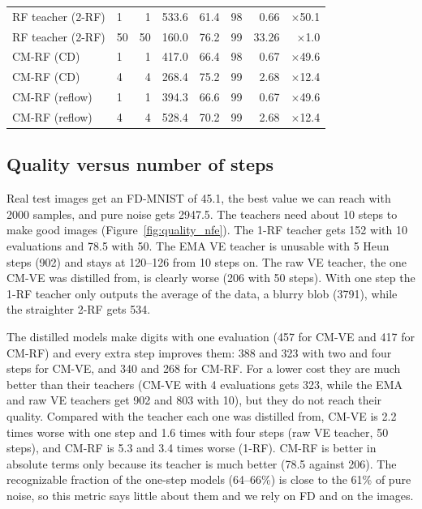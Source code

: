 \documentclass{article}
\begin{document}
\begin{table}[!htbp]
\begin{tabular}{llrrrrrr}
    RF teacher (2-RF) & 1 & 1 & 533.6 & 61.4 & 98 & 0.66 & $\times$50.1 \\
    RF teacher (2-RF) & 50 & 50 & 160.0 & 76.2 & 99 & 33.26 & $\times$1.0 \\
    \midrule
    CM-RF (CD) & 1 & 1 & 417.0 & 66.4 & 98 & 0.67 & $\times$49.6 \\
    CM-RF (CD) & 4 & 4 & 268.4 & 75.2 & 99 & 2.68 & $\times$12.4 \\
    \midrule
    CM-RF (reflow) & 1 & 1 & 394.3 & 66.6 & 99 & 0.67 & $\times$49.6 \\
    CM-RF (reflow) & 4 & 4 & 528.4 & 70.2 & 99 & 2.68 & $\times$12.4 \\
    \bottomrule
  \end{tabular}
\end{table}

\subsection{Quality versus number of steps}

Real test images get an FD-MNIST of 45.1, the best value we can reach with 2000
samples, and pure noise gets 2947.5. The teachers need about 10 steps to make
good images (Figure~\ref{fig:quality_nfe}). The 1-RF teacher gets 152 with 10
evaluations and 78.5 with 50. The EMA VE teacher is unusable with 5 Heun steps
(902) and stays at 120--126 from 10 steps on. The raw VE teacher, the one CM-VE
was distilled from, is clearly worse (206 with 50 steps). With one step the 1-RF
teacher only outputs the average of the data, a blurry blob (3791), while the
straighter 2-RF gets 534.

The distilled models make digits with one evaluation (457 for CM-VE and 417 for
CM-RF) and every extra step improves them: 388 and 323 with two and four steps
for CM-VE, and 340 and 268 for CM-RF. For a lower cost they are much better than
their teachers (CM-VE with 4 evaluations gets 323, while the EMA and raw VE
teachers get 902 and 803 with 10), but they do not reach their quality. Compared
with the teacher each one was distilled from, CM-VE is 2.2 times worse with one
step and 1.6 times with four steps (raw VE teacher, 50 steps), and CM-RF is 5.3
and 3.4 times worse (1-RF). CM-RF is better in absolute terms only because its
teacher is much better (78.5 against 206). The recognizable fraction of the
one-step models (64--66\%) is close to the 61\% of pure noise, so this metric
says little about them and we rely on FD and on the images.
\end{document}

